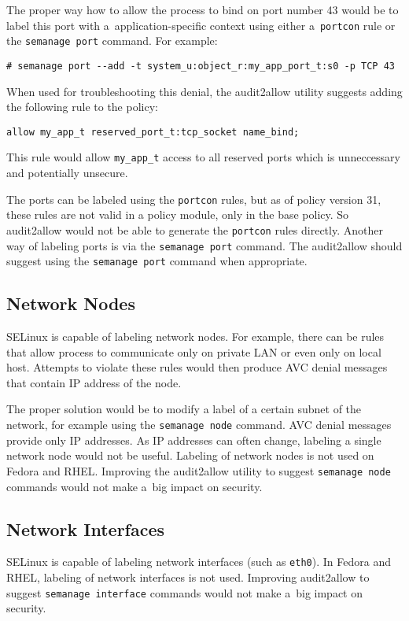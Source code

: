 The proper way how to allow the process to bind on port number 43 would be to
label this port with a~application-specific context using either
a~\texttt{portcon} rule or the \texttt{semanage port} command. For example:
\begin{lstlisting}
# semanage port --add -t system_u:object_r:my_app_port_t:s0 -p TCP 43
\end{lstlisting}

When used for troubleshooting this denial, the audit2allow utility suggests
adding the following rule to the policy:
\begin{lstlisting}[language=te]
allow my_app_t reserved_port_t:tcp_socket name_bind;
\end{lstlisting}
This rule would allow \texttt{my\_app\_t} access to all reserved ports which is
unneccessary and potentially unsecure.

The ports can be labeled using the \texttt{portcon} rules, but as of policy
version 31, these rules are not valid in a policy module, only in the base
policy. So audit2allow would not be able to generate the \texttt{portcon} rules
directly.  Another way of labeling ports is via the \texttt{semanage port}
command. The audit2allow should suggest using the \texttt{semanage port} command
when appropriate.

\subsection{Network Nodes}
SELinux is capable of labeling network nodes. For example, there can be rules
that allow process to communicate only on private LAN or even only on local
host. Attempts to violate these rules would then produce AVC denial messages
that contain IP address of the node.

The proper solution would be to modify a label of a certain subnet of the
network, for example using the \texttt{semanage node} command. AVC denial
messages provide only IP addresses. As IP addresses can often change, labeling
a single network node would not be useful. Labeling of network nodes is not used
on Fedora and RHEL. Improving the audit2allow utility to suggest
\texttt{semanage node} commands would not make a~big impact on security.

\subsection{Network Interfaces}
SELinux is capable of labeling network interfaces (such as \texttt{eth0}). In
Fedora and RHEL, labeling of network interfaces is not used. Improving
audit2allow to suggest \texttt{semanage interface} commands would not make a~big
impact on security.

